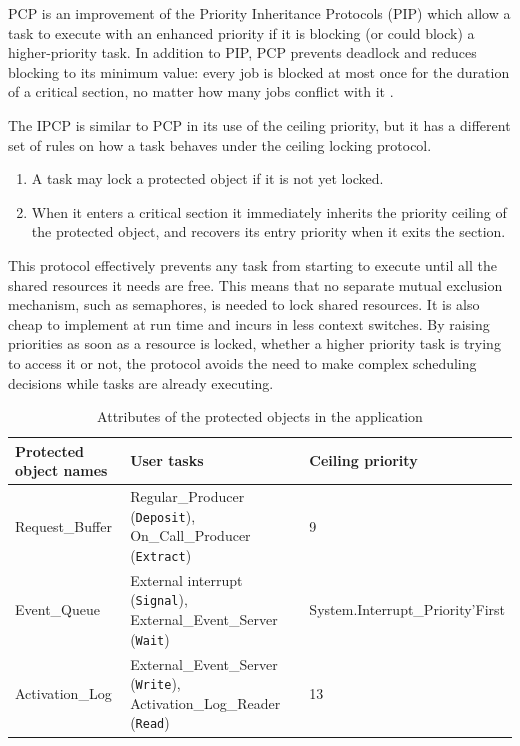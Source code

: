 \documentclass{article}
\begin{document}
PCP is an improvement of the Priority Inheritance Protocols (PIP) which allow a task to execute with an enhanced priority if it is blocking (or could block) a higher-priority task. In addition to PIP, PCP prevents deadlock and reduces blocking to its minimum value: every job is blocked at most once for the duration of a critical section, no matter how many jobs conflict with it \cite{pcp-blocking}.

The IPCP is similar to PCP in its use of the ceiling priority, but it has a different set of rules on how a task behaves under the ceiling locking protocol.

\begin{enumerate}
   \item A task may lock a protected object if it is not yet locked.
   \item When it enters a critical section it immediately inherits the priority ceiling of the protected object, and recovers its entry priority when it exits the section.
\end{enumerate}

This protocol effectively prevents any task from starting to execute until all the shared resources it needs are free. This means that no separate mutual exclusion mechanism, such as semaphores, is needed to lock shared resources. It is also cheap to implement at run time and incurs in less context switches. By raising priorities as soon as a resource is locked, whether a higher priority task is trying to access it or not, the protocol avoids the need to make complex scheduling decisions while tasks are already executing.

\begin{table}[!htbp]
   \centering
   \begin{tabular}{lll}
     \toprule
     Protected object names & User tasks & Ceiling priority  \\
     \midrule
     Request\_Buffer & Regular\_Producer (\texttt{Deposit}), On\_Call\_Producer (\texttt{Extract}) & 9 \\
     Event\_Queue & External interrupt (\texttt{Signal}), External\_Event\_Server (\texttt{Wait}) & System.Interrupt\_Priority'First \\
     Activation\_Log & External\_Event\_Server (\texttt{Write}), Activation\_Log\_Reader (\texttt{Read}) & 13 \\
     \bottomrule
   \end{tabular}
   \caption{Attributes of the protected objects in the application \cite{ycs}}
   \label{tab:po-attributes}
\end{table}
\end{document}
